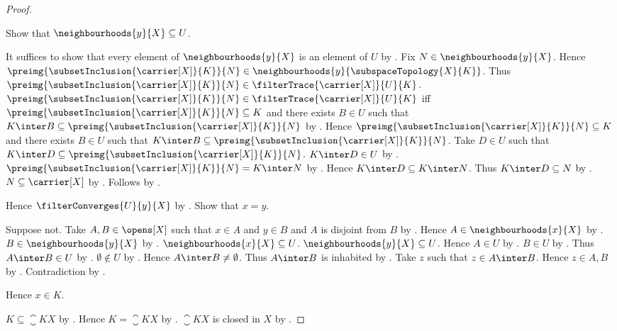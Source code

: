 \begin{proof}
\begin{subproof}
        Show that $\neighbourhoods{y}{X}\subseteq U$.
        \begin{subproof}
            It suffices to show that every element of
                $\neighbourhoods{y}{X}$ is an element of $U$ by
                .
            Fix $N\in\neighbourhoods{y}{X}$.
            Hence $\preimg{\subsetInclusion{\carrier[X]}{K}}{N}
                \in\neighbourhoods{y}{\subspaceTopology{X}{K}}$.
            Thus $\preimg{\subsetInclusion{\carrier[X]}{K}}{N}
                \in\filterTrace{\carrier[X]}{U}{K}$.
            $\preimg{\subsetInclusion{\carrier[X]}{K}}{N}
                \in\filterTrace{\carrier[X]}{U}{K}$ iff
                $\preimg{\subsetInclusion{\carrier[X]}{K}}{N}
                    \subseteq K$ and there exists $B\in U$ such that
                    $K\inter B\subseteq
                        \preimg{\subsetInclusion{\carrier[X]}{K}}{N}$ by
                .
            Hence $\preimg{\subsetInclusion{\carrier[X]}{K}}{N}
                \subseteq K$ and there exists $B\in U$ such that
                $K\inter B\subseteq
                    \preimg{\subsetInclusion{\carrier[X]}{K}}{N}$.
            Take $D\in U$ such that
                $K\inter D\subseteq
                    \preimg{\subsetInclusion{\carrier[X]}{K}}{N}$.
            $K\inter D\in U$ by .
            $\preimg{\subsetInclusion{\carrier[X]}{K}}{N}=K\inter N$ by
                .
            Hence $K\inter D\subseteq K\inter N$.
            Thus $K\inter D\subseteq N$ by
                .
            $N\subseteq\carrier[X]$ by
                .
            Follows by .
        \end{subproof}
        Hence $\filterConverges{U}{y}{X}$ by
            .
        Show that $x=y$.
        \begin{subproof}
            Suppose not.
            Take $A,B\in\opens[X]$ such that $x\in A$ and $y\in B$ and
                $A$ is disjoint from $B$ by .
            Hence $A\in\neighbourhoods{x}{X}$ by
                .
            $B\in\neighbourhoods{y}{X}$ by
                .
            $\neighbourhoods{x}{X}\subseteq U$.
            $\neighbourhoods{y}{X}\subseteq U$.
            Hence $A\in U$ by .
            $B\in U$ by .
            Thus $A\inter B\in U$ by .
            $\emptyset\notin U$ by
                .
            Hence $A\inter B\neq\emptyset$.
            Thus $A\inter B$ is inhabited by
                .
            Take $z$ such that $z\in A\inter B$.
            Hence $z\in A,B$ by .
            Contradiction by .
        \end{subproof}
        Hence $x\in K$.
    \end{subproof}

    $K\subseteq\closure{K}{X}$ by
        .
    Hence $K=\closure{K}{X}$ by .
    $\closure{K}{X}$ is closed in $X$ by .
\end{proof}

